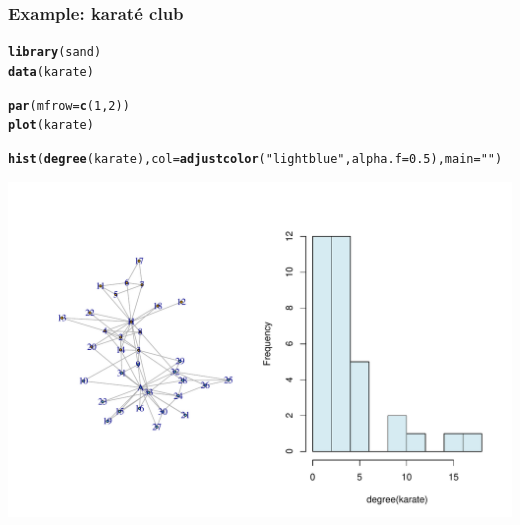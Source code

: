 \documentclass{beamer}\usepackage[]{graphicx}\usepackage[]{color}
\makeatletter
\newcommand{\hlnum}[1]{\textcolor[rgb]{0.686,0.059,0.569}{#1}}%
\newcommand{\hlstr}[1]{\textcolor[rgb]{0.192,0.494,0.8}{#1}}%
\newcommand{\hlstd}[1]{\textcolor[rgb]{0.345,0.345,0.345}{#1}}%
\newcommand{\hlkwc}[1]{\textcolor[rgb]{0.333,0.667,0.333}{#1}}%
\newcommand{\hlkwd}[1]{\textcolor[rgb]{0.737,0.353,0.396}{\textbf{#1}}}%
\newenvironment{kframe}{%
 \def\at@end@of@kframe{}%
 \ifinner\ifhmode%
  \def\at@end@of@kframe{\end{minipage}}%
  \begin{minipage}{\columnwidth}%
 \fi\fi%
 \def\FrameCommand##1{\hskip\@totalleftmargin \hskip-\fboxsep
 \colorbox{shadecolor}{##1}\hskip-\fboxsep
     \hskip-\linewidth \hskip-\@totalleftmargin \hskip\columnwidth}%
 \MakeFramed {\advance\hsize-\width
   \@totalleftmargin\z@ \linewidth\hsize
   \@setminipage}}%
 {\par\unskip\endMakeFramed%
 \at@end@of@kframe}
\newenvironment{knitrout}{}{} %
\makeatother
\begin{document}
\begin{frame}[fragile]
  \frametitle{Example: karaté club}

\begin{knitrout}\scriptsize
{}\color{fgcolor}\begin{kframe}
\begin{alltt}
\hlkwd{library}\hlstd{(sand)}
\hlkwd{data}\hlstd{(karate)}

\hlkwd{par}\hlstd{(}\hlkwc{mfrow}\hlstd{=}\hlkwd{c}\hlstd{(}\hlnum{1}\hlstd{,}\hlnum{2}\hlstd{))}
\hlkwd{plot}\hlstd{(karate)}

\hlkwd{hist}\hlstd{(}\hlkwd{degree}\hlstd{(karate),} \hlkwc{col}\hlstd{=}\hlkwd{adjustcolor}\hlstd{(}\hlstr{"lightblue"}\hlstd{,} \hlkwc{alpha.f} \hlstd{=} \hlnum{0.5}\hlstd{),} \hlkwc{main}\hlstd{=}\hlstr{""}\hlstd{)}
\end{alltt}
\end{kframe}
\includegraphics[width=.8\textwidth]{figures/degree_1-1} 

\end{knitrout}
      
\end{frame}
\end{document}
